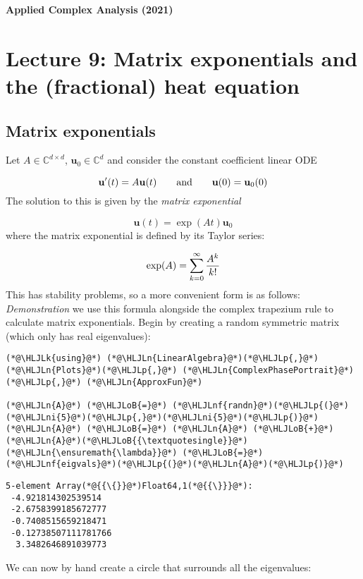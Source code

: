 \documentclass[12pt,landscape]{article}
\newcommand{\HLJLk}[1]{\textcolor[RGB]{148,91,176}{\textbf{#1}}}
\newcommand{\HLJLn}[1]{#1}
\newcommand{\HLJLnf}[1]{\textcolor[RGB]{66,102,213}{#1}}
\newcommand{\HLJLni}[1]{\textcolor[RGB]{59,151,46}{#1}}
\newcommand{\HLJLoB}[1]{\textcolor[RGB]{102,102,102}{\textbf{#1}}}
\newcommand{\HLJLp}[1]{#1}
\begin{document}
{\LARGE
\sf
\textbf{Applied Complex Analysis (2021)}

\section{Lecture 9: Matrix exponentials and the (fractional) heat equation}
\subsection{Matrix exponentials}
Let $A \in {\mathbb C}^{d \times d}$,   ${\mathbf u}_0 \in {\mathbb C}^d$ and consider the constant coefficient linear ODE

\[
    {\mathbf u}'(t) = A {\mathbf u}(t)\qquad\hbox{and}\qquad {\mathbf u}(0) = {\mathbf u}_0(0)
\]
The solution to this is given by the \emph{matrix exponential}

\[
    {\mathbf u}(t) = \exp(A t) {\mathbf u}_0
\]
where the matrix exponential is defined by its Taylor series:

\[
    \exp(A) = \sum_{k=0}^\infty {A^k \over k!}
\]
This has stability problems, so a more convenient form is as follows:
\newpage
\emph{Demonstration} we use this formula alongside the complex trapezium rule to calculate matrix exponentials. Begin by creating a random symmetric matrix (which only has real eigenvalues):


\begin{lstlisting}
(*@\HLJLk{using}@*) (*@\HLJLn{LinearAlgebra}@*)(*@\HLJLp{,}@*) (*@\HLJLn{Plots}@*)(*@\HLJLp{,}@*) (*@\HLJLn{ComplexPhasePortrait}@*)(*@\HLJLp{,}@*) (*@\HLJLn{ApproxFun}@*)

(*@\HLJLn{A}@*) (*@\HLJLoB{=}@*) (*@\HLJLnf{randn}@*)(*@\HLJLp{(}@*)(*@\HLJLni{5}@*)(*@\HLJLp{,}@*)(*@\HLJLni{5}@*)(*@\HLJLp{)}@*)
(*@\HLJLn{A}@*) (*@\HLJLoB{=}@*) (*@\HLJLn{A}@*) (*@\HLJLoB{+}@*) (*@\HLJLn{A}@*)(*@\HLJLoB{{\textquotesingle}}@*)
(*@\HLJLn{\ensuremath{\lambda}}@*) (*@\HLJLoB{=}@*) (*@\HLJLnf{eigvals}@*)(*@\HLJLp{(}@*)(*@\HLJLn{A}@*)(*@\HLJLp{)}@*)
\end{lstlisting}

\begin{lstlisting}
5-element Array(*@{{\{}}@*)Float64,1(*@{{\}}}@*):
 -4.921814302539514
 -2.6758399185672777
 -0.7408515659218471
 -0.12738507111781766
  3.3482646891039773
\end{lstlisting}


We can now by hand create a circle that surrounds all the eigenvalues:


}
\end{document}
